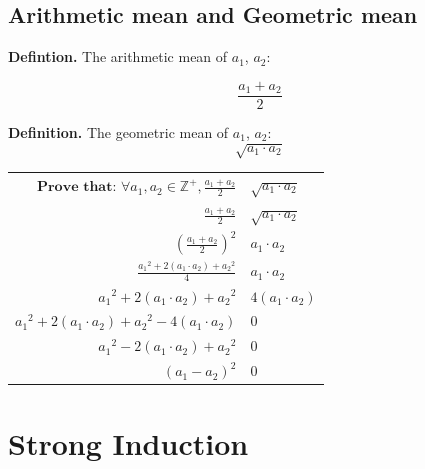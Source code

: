 \documentclass{article}
\begin{document}

\subsection{Arithmetic mean and Geometric mean}

\hrulefill

\begin{center}
\begin{minipage}{0.35\textwidth}

\textbf{Defintion.} The arithmetic mean of $a_1$, $a_2$:

$$\frac{a_1 + a_2}{2}$$

\textbf{Definition.} The geometric mean of $a_1$, $a_2$:
$$\sqrt{a_1 \cdot a_2}$$
\end{minipage}
\hspace{0.3cm}
\vline
\begin{minipage}{0.5\textwidth}
  \hspace{0.3cm}
{\large \renewcommand{\arraystretch}{1.5}
\begin{tabular}{r@{$\geq$}l}
$\textbf{Prove that: }\forall a_1,a_2 \in \mathbb Z^+, \displaystyle\frac{a_1 + a_2}{2} $&$ \sqrt{a_1 \cdot a_2}$\\
$\displaystyle\frac{a_1 + a_2}{2} $&$ \sqrt{a_1 \cdot a_2}$\\
$(\displaystyle\frac{a_1 + a_2}{2})^2 $&$ a_1 \cdot a_2$\\
$\displaystyle\frac{ {a_1}^2 + 2(a_1 \cdot a_2) + {a_2}^2 }{4} $&$ a_1 \cdot a_2$\\
${a_1}^2 + 2(a_1 \cdot a_2) + {a_2}^2 $&$ 4 (a_1 \cdot a_2)$\\
$ {a_1}^2 + 2(a_1 \cdot a_2) + {a_2}^2 - 4 (a_1 \cdot a_2) $&$ 0$\\
${a_1}^2 - 2(a_1 \cdot a_2) + {a_2}^2 $&$ 0$\\
$(a_1 - a_2)^2 $&$ 0$\\
\end{tabular}
}
\end{minipage}

\end{center}


\pagebreak

\text{}

\section{Strong Induction}
\end{document}
